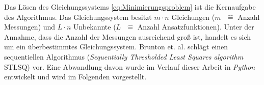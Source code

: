Das Lösen des Gleichungssystems \eqref{eq:Minimierungsproblem} ist die Kernaufgabe des Algorithmus. Das Gleichungssystem besitzt $m\cdot n$ Gleichungen ($m\text{ } \hat{=}$ Anzahl Messungen) und $L\cdot n$ Unbekannte ($L\text{ } \hat{=}$ Anzahl Ansatzfunktionen). Unter der Annahme, dass die Anzahl der Messungen ausreichend groß ist, handelt es sich um ein überbestimmtes Gleichungssystem. 
Brunton et. al. \cite{Brunton2016}  schlägt einen sequentiellen Algorithmus (\textit{Sequentially Thresholded Least Squares algorithm} STLSQ) vor. Eine Abwandlung davon wurde im Verlauf dieser Arbeit in \textit{Python} entwickelt und wird im Folgenden vorgestellt.
